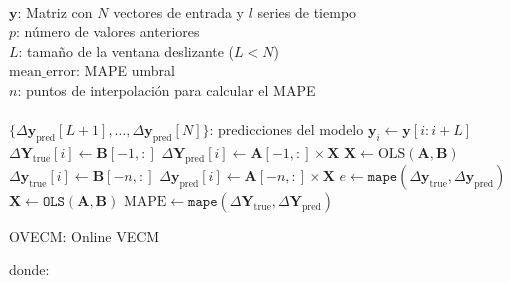 \begin{algorithm}[ht]
\begin{algorithmic}[1]
\REQUIRE $\,$ \\
$\mathbf{y}$: Matriz con $N$ vectores de entrada y $l$ series de tiempo\\
$p$: número de valores anteriores \\
$L$: tamaño de la ventana deslizante ($L<N$) \\
$\text{mean\_error}$: MAPE umbral \\
$n$: puntos de interpolación para calcular el MAPE\\
\ENSURE  $\,$ \\
$\{\Delta \mathbf{y}_{\text{pred}}[L+1],\dots,\Delta \mathbf{y}_{\text{pred}}[N]\}$: predicciones del modelo
    \STATE $\mathbf{y}_i \gets \mathbf{y}[i:i+L]$
    \ELSE
        \STATE $\Delta \mathbf{Y}_{\text{true}}[i] \gets \mathbf{B}[-1,:]$
        \STATE $\Delta \mathbf{Y}_{\text{pred}}[i] \gets \mathbf{A}[-1,:] \times \mathbf{X}$
    \ENDIF
    \STATE $\mathbf{X} \gets \text{OLS} (\mathbf{A},\mathbf{B})$
    \STATE $\Delta \mathbf{y}_{\text{true}}[i] \gets \mathbf{B}[-n,:]$
    \STATE $\Delta \mathbf{y}_{\text{pred}}[i] \gets \mathbf{A}[-n,:] \times \mathbf{X}$
    \STATE $e \gets \texttt{mape}(\Delta \mathbf{y}_{\text{true}}, \Delta
    \mathbf{y}_{\text{pred}})$
        \STATE $\mathbf{X} \gets \texttt{OLS} (\mathbf{A},\mathbf{B})$
    \ENDIF
\ENDFOR
\STATE $\text{MAPE} \gets \texttt{mape}(\Delta \mathbf{Y}_{\text{true}}, \Delta
\mathbf{Y}_{\text{pred}})$
\end{algorithmic}
\caption{OVECM: Online VECM}
\label{alg:proposal}
\end{algorithm}

\noindent donde:

